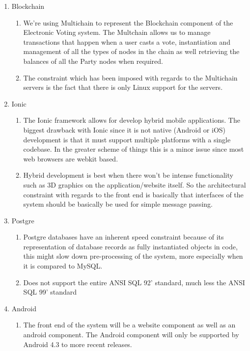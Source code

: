 \begin{enumerate}
	\item Blockchain
	\begin{enumerate}
		\item We're using Multichain to represent the Blockchain component of the Electronic Voting system. The Multchain allows us to manage transactions that happen when a user casts a vote, instantiation and management of all the types of nodes in the chain as well retrieving the balances of all the Party nodes when required. 
		
		\item The constraint which has been imposed with regards to the Multichain servers is the fact that there is only Linux support for the servers. 
		
	\end{enumerate}
	
	\item Ionic
	\begin{enumerate}
		\item The Ionic framework allows for develop hybrid mobile applications. The biggest drawback with Ionic since it is not native (Android or iOS) development is that it must support multiple platforms with a single codebase. In the greater scheme of things this is a minor issue since most web browsers are webkit based.
		
		\item Hybrid development is best when there won’t be intense functionality such as 3D graphics on the application/website itself. So the architectural constraint with regards to the front end is basically that interfaces of the system should be basically be used for simple message passing.  
	\end{enumerate}
	
	\item Postgre
	\begin{enumerate}
		\item Postgre databases have an inherent speed constraint because of its representation of database records as fully instantiated objects in code, this might slow down pre-processing of the system, more especially when it is compared to MySQL. 
		
		\item Does not support the entire ANSI SQL 92' standard, much less the ANSI SQL 99' standard
	\end{enumerate}
	
	\item Android 
	\begin{enumerate}
		\item The front end of the system will be a website component as well as an android component. The Android component will only be supported by Android 4.3 to more recent releases. 
	\end{enumerate}
\end{enumerate}
